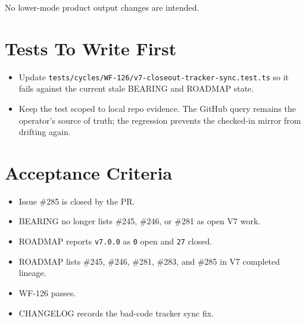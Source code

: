 No lower-mode product output changes are intended.

\section{Tests To Write First}\label{record-209-tests-to-write-first}

\begin{itemize}
\tightlist
\item
  Update \texttt{t\allowbreak{}e\allowbreak{}s\allowbreak{}t\allowbreak{}s\allowbreak{}/\allowbreak{}c\allowbreak{}y\allowbreak{}c\allowbreak{}l\allowbreak{}e\allowbreak{}s\allowbreak{}/\allowbreak{}W\allowbreak{}F\allowbreak{}-\allowbreak{}1\allowbreak{}2\allowbreak{}6\allowbreak{}/\allowbreak{}v\allowbreak{}7\allowbreak{}-\allowbreak{}c\allowbreak{}l\allowbreak{}o\allowbreak{}s\allowbreak{}e\allowbreak{}o\allowbreak{}u\allowbreak{}t\allowbreak{}-\allowbreak{}t\allowbreak{}r\allowbreak{}a\allowbreak{}c\allowbreak{}k\allowbreak{}e\allowbreak{}r\allowbreak{}-\allowbreak{}s\allowbreak{}y\allowbreak{}n\allowbreak{}c\allowbreak{}.\allowbreak{}t\allowbreak{}e\allowbreak{}s\allowbreak{}t\allowbreak{}.\allowbreak{}t\allowbreak{}s} so it fails against the current stale BEARING and ROADMAP state.
\item
  Keep the test scoped to local repo evidence. The GitHub query remains the operator's source of truth; the regression prevents the checked-in mirror from drifting again.
\end{itemize}

\section{Acceptance Criteria}\label{record-209-acceptance-criteria}

\begin{itemize}
\tightlist
\item
  Issue \#285 is closed by the PR.
\item
  BEARING no longer lists \#245, \#246, or \#281 as open V7 work.
\item
  ROADMAP reports \texttt{v\allowbreak{}7\allowbreak{}.\allowbreak{}0\allowbreak{}.\allowbreak{}0} as \texttt{0} open and \texttt{2\allowbreak{}7} closed.
\item
  ROADMAP lists \#245, \#246, \#281, \#283, and \#285 in V7 completed lineage.
\item
  WF-126 passes.
\item
  CHANGELOG records the bad-code tracker sync fix.
\end{itemize}

